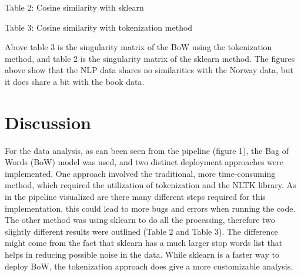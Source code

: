\documentclass{article}
\begin{document}
\begin{multicols}{2}
{\small
  \vspace{6pt}
  Table 2: Cosine similarity with sklearn
  \par
  \vspace{12pt}
}


{\small
  \vspace{6pt}
  Table 3: Cosine similarity with tokenization method
  \par
  \vspace{12pt}
}

Above table 3 is the singularity matrix of the BoW using the tokenization method, and table 2 is the singularity matrix of the sklearn method. The figures above show that the NLP data shares no similarities with the Norway data, but it does share a bit with the book data.

\section{Discussion}

For the data analysis, as can been seen from the pipeline (figure 1), the Bag of Words (BoW) model was used, and two distinct deployment approaches were implemented. One approach involved the traditional, more time-consuming method, which required the utilization of tokenization and the NLTK library. As in the pipeline visualized are there many different steps required for this implementation, this could lead to more bugs and errors when running the code. The other method was using sklearn to do all the processing, therefore two slightly different results were outlined (Table 2 and Table 3). The difference might come from the fact that sklearn has a much larger stop words list that helps in reducing possible noise in the data. While sklearn is a faster way to deploy BoW, the tokenization approach does give a more customizable analysis. 


\end{multicols}
\end{document}
